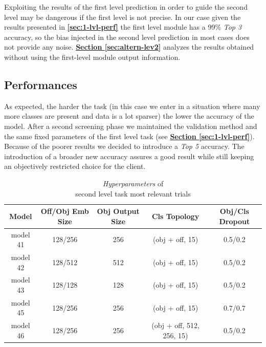 \documentclass[12pt]{article}
\begin{document}
Exploiting the results of the first level prediction in order to guide the second level may be dangerous if the first level is not precise. In our case given the results presented in \textbf{\ref{sec:1-lvl-perf}} the first level module has a 99\% \textit{Top 3} accuracy, so the bias injected in the second level prediction in most cases does not provide any noise. \hyperref[sec:altern-lev2]{\textbf{Section \ref{sec:altern-lev2}}} analyzes the results obtained without using the first-level module output information.

\subsection{Performances}\label{sec:secondlevelperformances}
As expected, the harder the task (in this case we enter in a situation where many more classes are present and data is a lot sparser) the lower the accuracy of the model. After a second screening phase we maintained the validation method and the same fixed parameters of the first level task (see \hyperref[sec:1-lvl-perf]{\textbf{Section \ref{sec:1-lvl-perf}}}). Because of the poorer results we decided to introduce a \textit{Top 5} accuracy. The introduction of a broader new accuracy assures a good result while still keeping an objectively restricted choice for the client. 

\begin{table}[h!]
	    \centering
	    \scriptsize
	    \begin{tabular}{ |c|c|c|c|c| }
        \hline
        \textbf{Model} & \textbf{Off/Obj Emb Size} & \textbf{Obj Output Size} & \textbf{Cls Topology} & \textbf{Obj/Cls Dropout}\\
        \hline
        model 41 & 128/256 & 256 & (obj + off, 15) & 0.5/0.2\\
        model 42 & 128/512 & 512 & (obj + off, 15) & 0.5/0.2\\
        model 43 & 128/128 & 128 & (obj + off, 15) & 0.5/0.2\\
        model 45 & 128/256 & 256 & (obj + off, 15) & 0.7/0.7\\
        model 46 & 128/256 & 256 & (obj + off, 512, 256, 15) & 0.5/0.2\\
        \hline
        \end{tabular}
        \captionsetup{justification   = centering}
	    \caption{\textit{Hyperparameters} of \\second level task most relevant trials}
        \label{tb:secondlevel}
\end{table}
\end{document}

